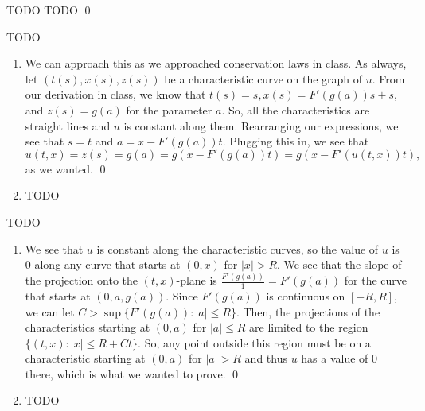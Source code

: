 \documentclass{article}
\begin{document}
\newpage
{} TODO
\hop
\solution
TODO \qed


\newpage
{} TODO
\hop
\solution
\begin{enumerate}
    \item We can approach this as we approached conservation laws in class. As always, let $(t(s), x(s), z(s))$ be a characteristic curve on the graph of $u$. From our derivation in class, we know that $t(s) = s, x(s)= F'(g(a))s + s$, and $z(s) = g(a)$ for the parameter $a$. So, all the characteristics are straight lines and $u$ is constant along them. Rearranging our expressions, we see that $s = t$ and $a = x - F'(g(a))t$. Plugging this in, we see that 
    \[u(t,x) = z(s) = g(a) = g(x - F'(g(a))t) = g(x - F'(u(t,x))t),\]
    as we wanted.  \qed
    \item TODO
\end{enumerate}


\newpage
{} TODO
\hop
\solution
\begin{enumerate}
    \item We see that $u$ is constant along the characteristic curves, so the value of $u$ is $0$ along any curve that starts at $(0,x)$ for $|x| > R$. We see that the slope of the projection onto the $(t,x)$-plane is $\frac{F'(g(a))}{1} = F'(g(a))$ for the curve that starts at $(0, a, g(a))$. Since $F'(g(a))$ is continuous on $[-R, R]$, we can let $C > \sup \{F'(g(a)) : |a| \le R \}$. Then, the projections of the characteristics starting at $(0,a)$ for $|a| \le R$ are limited to the region $\{(t,x): |x| \le R+Ct\}$. So, any point outside this region must be on a characteristic starting at  $(0,a)$ for $|a| > R$ and thus $u$ has a value of 0 there, which is what we wanted to prove. \qed 
    \item TODO
\end{enumerate}
\end{document}
